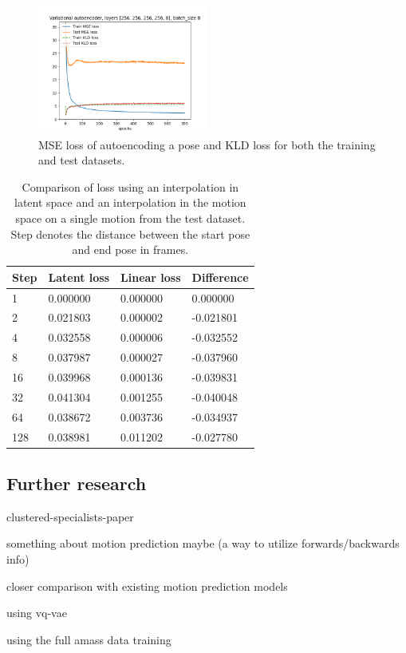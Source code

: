 \begin{figure}[h]
\centering
\includegraphics[width=0.5\textwidth]{img/vae_256-256-256-256-8_batch-8_losses}
\caption{MSE loss of autoencoding a pose and KLD loss for both the training and test datasets.}
\label{fig:vae-loss}
\end{figure}

\begin{table}[h]
\centering
\begin{tabular}{@{}llll@{}}
\toprule
Step & Latent loss & Linear loss & Difference  \\ \midrule
1    & 0.000000    & 0.000000    & 0.000000    \\
2    & 0.021803    & 0.000002    & -0.021801   \\
4    & 0.032558    & 0.000006    & -0.032552   \\
8    & 0.037987    & 0.000027    & -0.037960   \\
16   & 0.039968    & 0.000136    & -0.039831   \\
32   & 0.041304    & 0.001255    & -0.040048   \\
64   & 0.038672    & 0.003736    & -0.034937   \\
128  & 0.038981    & 0.011202    & -0.027780   \\ \bottomrule
\end{tabular}
\caption{Comparison of loss using an interpolation in latent space and an interpolation in the motion space on a single motion from the test dataset. Step denotes the distance between the start pose and end pose in frames.}
\label{tab:vae-eval}
\end{table}




\subsection{Further research}\label{subsec:further-research}
clustered-specialists-paper~\cite{won2020scalable}

something about motion prediction maybe (a way to utilize forwards/backwards info)

closer comparison with existing motion prediction models

using vq-vae

using the full amass data training
